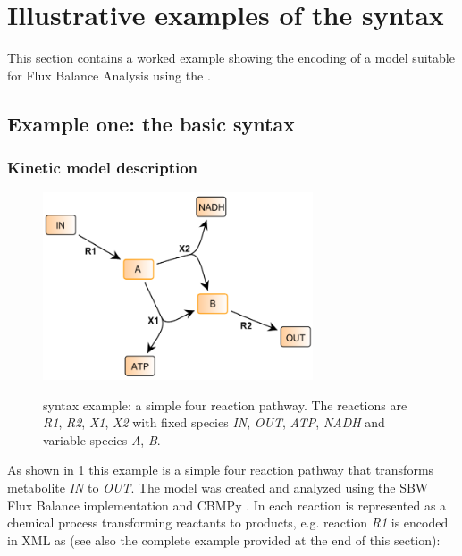 
\section{Illustrative examples of the \FBC syntax}
\label{examples}

This section contains a worked example showing the encoding of a model suitable for Flux Balance Analysis using the \FBCPackage.

\subsection{Example one: the basic \FBC syntax}
\label{examples1}
\subsubsection{Kinetic model description}
\begin{figure}[h]
  \centering
  \includegraphics[width=8cm]{examples/spec-example1.pdf}\\
  \caption{\FBC syntax example: a simple four reaction pathway. The
  reactions are \textit{R1}, \textit{R2}, \textit{X1}, \textit{X2} with
  fixed species \textit{IN}, \textit{OUT}, \textit{ATP}, \textit{NADH} and
  variable species \textit{A}, \textit{B}.}
  \label{fig:example1}
\end{figure}

As shown in \ref{fig:example1} this example is a simple four reaction
pathway that transforms metabolite \textit{IN} to \textit{OUT}. The
model was created and analyzed using the \textsf{SBW Flux Balance} \FBC
implementation and CBMPy \citep{sbwfba, cbmpy}. In \SBML each reaction is represented as a chemical process transforming reactants to products, e.g. reaction
\textit{R1} is encoded in XML as (see also the complete example provided
at the end of this section):


